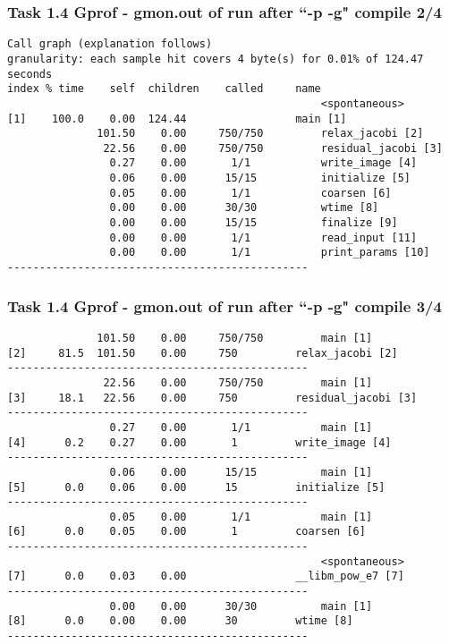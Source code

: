 \begin{frame}[fragile]
\frametitle{Task 1.4 Gprof - gmon.out of run after ``-p -g" compile 2/4}
\begin{lstlisting}
Call graph (explanation follows)
granularity: each sample hit covers 4 byte(s) for 0.01% of 124.47 seconds
index % time    self  children    called     name
                                                 <spontaneous>
[1]    100.0    0.00  124.44                 main [1]
              101.50    0.00     750/750         relax_jacobi [2]
               22.56    0.00     750/750         residual_jacobi [3]
                0.27    0.00       1/1           write_image [4]
                0.06    0.00      15/15          initialize [5]
                0.05    0.00       1/1           coarsen [6]
                0.00    0.00      30/30          wtime [8]
                0.00    0.00      15/15          finalize [9]
                0.00    0.00       1/1           read_input [11]
                0.00    0.00       1/1           print_params [10]
-----------------------------------------------
\end{lstlisting}
\end{frame}

\begin{frame}[fragile]
\frametitle{Task 1.4 Gprof - gmon.out of run after ``-p -g" compile 3/4}
\begin{lstlisting}
              101.50    0.00     750/750         main [1]
[2]     81.5  101.50    0.00     750         relax_jacobi [2]
-----------------------------------------------
               22.56    0.00     750/750         main [1]
[3]     18.1   22.56    0.00     750         residual_jacobi [3]
-----------------------------------------------
                0.27    0.00       1/1           main [1]
[4]      0.2    0.27    0.00       1         write_image [4]
-----------------------------------------------
                0.06    0.00      15/15          main [1]
[5]      0.0    0.06    0.00      15         initialize [5]
-----------------------------------------------
                0.05    0.00       1/1           main [1]
[6]      0.0    0.05    0.00       1         coarsen [6]
-----------------------------------------------
                                                 <spontaneous>
[7]      0.0    0.03    0.00                 __libm_pow_e7 [7]
-----------------------------------------------
                0.00    0.00      30/30          main [1]
[8]      0.0    0.00    0.00      30         wtime [8]
-----------------------------------------------
\end{lstlisting}
\end{frame}

